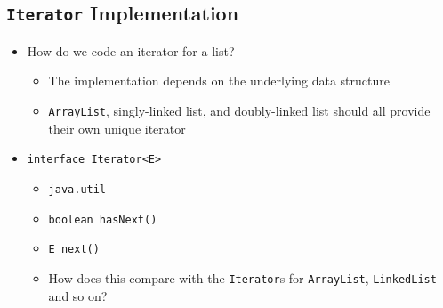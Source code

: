 \documentclass[10pt]{article}
\begin{document}
\subsection*{\texttt{Iterator} Implementation}
\begin{itemize}
    \item How do we code an iterator for a list?
    \begin{itemize}
        \item The implementation depends on the underlying data structure
        \item \texttt{ArrayList}, singly-linked list, and doubly-linked list should all provide their own unique iterator
    \end{itemize}
    \item \texttt{interface Iterator<E>}
    \begin{itemize}
        \item \texttt{java.util}
        \item \texttt{boolean hasNext()}
        \item \texttt{E next()}
        \item How does this compare with the \texttt{Iterator}s for \texttt{ArrayList}, \texttt{LinkedList} and so on?
    \end{itemize}
\end{itemize}
\end{document}
